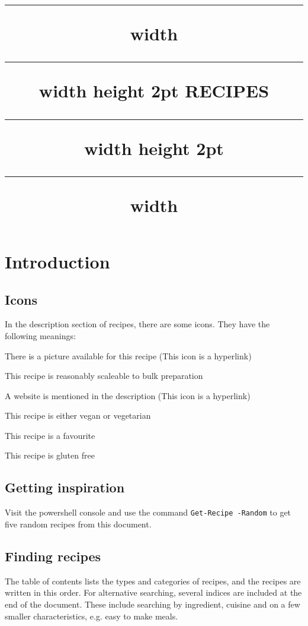 \documentclass[]{article}
\title{
	\vspace{5cm}
	\hrule width \hsize \kern 1mm \hrule width \hsize height 2pt
	\vspace{0.3cm}
	\textbf{\Huge{RECIPES}}
	\vspace{0.3cm}
	\hrule width \hsize height 2pt \kern 1mm \hrule width \hsize
}
\author{}
\date{}
\begin{document}
\maketitle
\large
\newpage
\tableofcontents

\setlength{\columnseprule}{0pt}

\newpage

\section*{\Huge Introduction}

\subsection*{\huge Icons}

In the description section of recipes, there are some icons. They have the following meanings:

\begin{description}[labelwidth=0.5cm]
\item[\faCameraRetro] There is a picture available for this recipe (This icon is a hyperlink)
\item[\faTruck] This recipe is reasonably scaleable to bulk preparation
\item[\faLink] A website is mentioned in the description (This icon is a hyperlink)
\item[\faVimeoSquare] This recipe is either vegan or vegetarian
\item[\faHeart] This recipe is a favourite
\item[\faGlide] This recipe is gluten free
\end{description}

\subsection*{\huge Getting inspiration}
Visit the powershell console and use the command \texttt{\color{accent}Get-Recipe -Random} to get five random recipes from this document.

\subsection*{\huge Finding recipes}
The table of contents lists the types and categories of recipes, and the recipes are written in this order. For alternative searching, several indices are included at the end of the document. These include searching by ingredient, cuisine and on a few smaller characteristics, e.g. easy to make meals.
\end{document}
